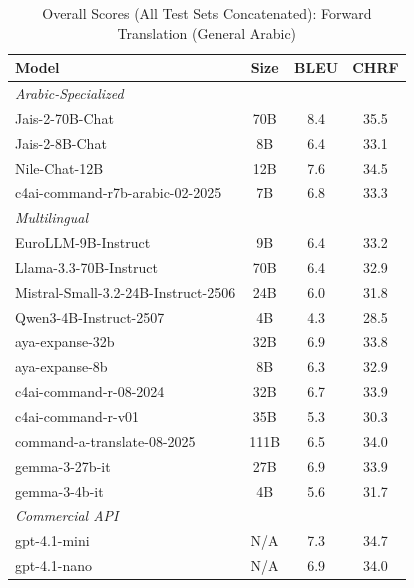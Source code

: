 \begin{table}[htbp]
\centering
\caption{Overall Scores (All Test Sets Concatenated): Forward Translation (General Arabic)}
\label{tab:overall_scores_forward_arabic_general}
\begin{tabular}{l@{\hspace{3pt}}c@{\hspace{3pt}}c@{\hspace{3pt}}c}
\toprule
Model & Size & BLEU & CHRF \\
\midrule
\multicolumn{4}{l}{\textit{Arabic-Specialized}} \\
\midrule
Jais-2-70B-Chat & 70B & 8.4 & 35.5 \\
Jais-2-8B-Chat & 8B & 6.4 & 33.1 \\
Nile-Chat-12B & 12B & 7.6 & 34.5 \\
c4ai-command-r7b-arabic-02-2025 & 7B & 6.8 & 33.3 \\
\midrule
\multicolumn{4}{l}{\textit{Multilingual}} \\
\midrule
EuroLLM-9B-Instruct & 9B & 6.4 & 33.2 \\
Llama-3.3-70B-Instruct & 70B & 6.4 & 32.9 \\
Mistral-Small-3.2-24B-Instruct-2506 & 24B & 6.0 & 31.8 \\
Qwen3-4B-Instruct-2507 & 4B & 4.3 & 28.5 \\
aya-expanse-32b & 32B & 6.9 & 33.8 \\
aya-expanse-8b & 8B & 6.3 & 32.9 \\
c4ai-command-r-08-2024 & 32B & 6.7 & 33.9 \\
c4ai-command-r-v01 & 35B & 5.3 & 30.3 \\
command-a-translate-08-2025 & 111B & 6.5 & 34.0 \\
gemma-3-27b-it & 27B & 6.9 & 33.9 \\
gemma-3-4b-it & 4B & 5.6 & 31.7 \\
\midrule
\multicolumn{4}{l}{\textit{Commercial API}} \\
\midrule
gpt-4.1-mini & N/A & 7.3 & 34.7 \\
gpt-4.1-nano & N/A & 6.9 & 34.0 \\
\midrule
\bottomrule
\end{tabular}
\end{table}